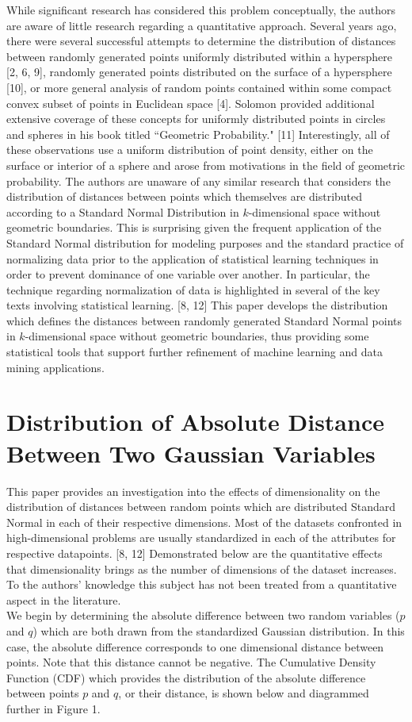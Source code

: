 \documentclass[11pt]{article} %
\begin{document}
While significant research has considered this problem conceptually, the authors are aware of little research regarding a quantitative approach.  Several years ago, there were several successful attempts to determine the distribution of distances between randomly generated points uniformly distributed within a hypersphere [2, 6, 9], randomly generated points distributed on the surface of a hypersphere [10], or more general analysis of random points contained within some compact convex subset of points in Euclidean space [4].  Solomon provided additional extensive coverage of these concepts for uniformly distributed points in circles and spheres in his book titled ``Geometric Probability." [11]  Interestingly, all of these observations use a uniform distribution of point density, either on the surface or interior of a sphere and arose from motivations in the field of geometric probability.   The authors are unaware of any similar research that considers the distribution of distances between points which themselves are distributed according to a Standard Normal Distribution in $k$-dimensional space without geometric boundaries.  This is surprising given the frequent application of the Standard Normal distribution for modeling purposes and the standard practice of normalizing data prior to the application of statistical learning techniques in order to prevent dominance of one variable over another.  In particular, the technique regarding normalization of data is highlighted in several of the key texts involving statistical learning. [8, 12]  This paper develops the distribution which defines the distances between randomly generated Standard Normal points in $k$-dimensional space without geometric boundaries, thus providing some statistical tools that support further refinement of machine learning and data mining applications.

\section{Distribution of Absolute Distance Between Two Gaussian Variables}

    This paper provides an investigation into the effects of dimensionality on the distribution of distances between random points which are distributed Standard Normal in each of their respective dimensions.  Most of the datasets confronted in high-dimensional problems are usually standardized in each of the attributes for respective datapoints. [8, 12]  Demonstrated below are the quantitative effects that dimensionality brings as the number of dimensions of the dataset increases.  To the authors' knowledge this subject has not been treated from a quantitative aspect in the literature. \\
\indent
    We begin by determining the absolute difference between two random variables ($p$ and $q$) which are both drawn from the standardized Gaussian distribution.  In this case, the absolute difference corresponds to one dimensional distance between points.  Note that this distance cannot be negative.  The Cumulative Density Function (CDF) which provides the distribution of the absolute difference between points $p$ and $q$, or their distance, is shown below and diagrammed further in Figure 1.
\end{document}
